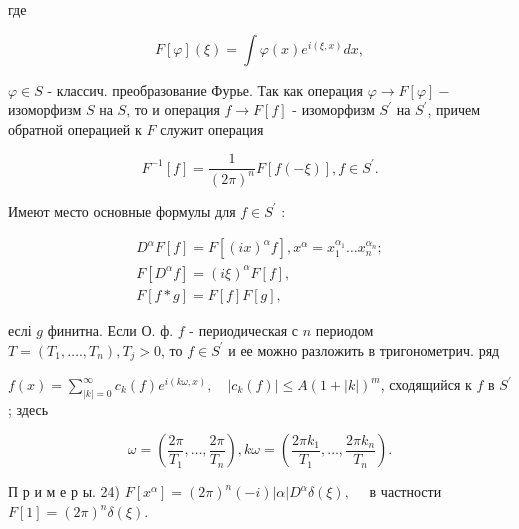 \documentclass[10pt]{article}
\begin{document}
где



\[

F[\varphi](\xi)=\int \varphi(x) e^{i(\xi, x)} d x,

\]



$\varphi \in S$ - классич. преобразование Фурье. Так как операция $\varphi \rightarrow F[\varphi]-$ изоморфизм $S$ на $S$, то и операция $f \rightarrow F[f]$ - изоморфизм $S^{\prime}$ на $S^{\prime}$, причем обратной операцией к $F$ служит операция



\[

F^{-1}[f]=\frac{1}{(2 \pi)^{n}} F[f(-\xi)], f \in S^{\prime} .

\]



Имеют место основные формулы для $f \in S^{\prime}$ :



\[

\begin{gathered}

D^{\alpha} F[f]=F\left[(i x)^{\alpha} f\right], x^{\alpha}=x_{1}^{\alpha_{1}} \ldots x_{n}^{\alpha_{n}} ; \\

F\left[D^{\alpha} f\right]=(i \xi)^{\alpha} F[f], \\

F[f * g]=F[f] F[g],

\end{gathered}

\]



еслі $g$ финитна. Если О. ф. $f$ - периодическая с $n$ периодом $T=\left(T_{1}, \ldots ., T_{n}\right), T_{j}>0$, то $f \in S^{\prime}$ и ее можно разложить в тригонометрич. ряд



$f(x)=\sum_{|k|=0}^{\infty} c_{k}(f) e^{i(k \omega, x)}, \quad\left|c_{k}(f)\right| \leqslant A(1+|k|)^{m}$, сходящийся к $f$ в $S^{\prime}$; здесь



\[

\omega=\left(\frac{2 \pi}{T_{1}}, \ldots, \frac{2 \pi}{T_{n}}\right), k \omega=\left(\frac{2 \pi k_{1}}{T_{1}}, \ldots, \frac{2 \pi k_{n}}{T_{n}}\right) .

\]



П р и м е р ы. 24) $F\left[x^{\alpha}\right]=(2 \pi)^{n}(-i)|\alpha| D^{\alpha} \delta(\xi), \quad$ в частности $F[1]=(2 \pi)^{n} \delta(\xi)$.
\end{document}
